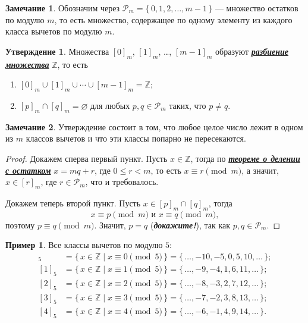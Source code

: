 \documentclass[14pt, a4paper]{extarticle}
\theoremstyle{definition}
\newtheorem*{remark}{Замечание}
\newtheorem{example}{Пример}
\newtheorem{statement}{Утверждение}
\begin{document}
	\begin{remark}
		Обозначим через $\mathcal{P}_m=\{\,0,1,2,\dots,m-1\,\}$ --- множество остатков по модулю $m$, то есть множество, содержащее по одному элементу из каждого класса вычетов по модулю $m$.
	\end{remark}
	
	\begin{statement}
		Множества $[0]_m$, $[1]_m$, \dots, $[m-1]_m$ образуют \href{https://ru.wikipedia.org/wiki/%D0%A0%D0%B0%D0%B7%D0%B1%D0%B8%D0%B5%D0%BD%D0%B8%D0%B5_%D0%BC%D0%BD%D0%BE%D0%B6%D0%B5%D1%81%D1%82%D0%B2%D0%B0}{\textbf{\textit{разбиение множества}}} $\mathbb{Z}$, то есть
		\begin{enumerate}[topsep=0pt,itemsep=-1ex,partopsep=1ex,parsep=1ex]
			\item $[0]_m\cup[1]_m\cup\cdots\cup[m-1]_m=\mathbb{Z}$;
			\item $[p]_m\cap[q]_m=\varnothing$ для любых $p,q\in\mathcal{P}_m$ таких, что $p\neq q$.
		\end{enumerate}
	\end{statement}
	\begin{remark}
		Утверждение состоит в том, что любое целое число лежит в одном из $m$ классов вычетов и что эти классы попарно не пересекаются.
	\end{remark}
	\begin{proof}
		Докажем сперва первый пункт. Пусть $x\in\mathbb{Z}$, тогда по \hyperref[ost]{\textbf{\textit{теореме о делении с остатком}}} $x=mq+r$, где $0\leqslant r<m$, то есть $x\equiv r\pmod{m}$, а значит, $x\in[r]_m$, где $r\in\mathcal{P}_m$, что и требовалось.
		
		Докажем теперь второй пункт. Пусть $x\in[p]_m\cap[q]_m$, тогда $$x\equiv p\pmod{m}\text{ и }x\equiv q\pmod{m},$$ поэтому $p\equiv q\pmod{m}$. Значит, $p=q$ (\textbf{\textit{докажите!}}), так как \mbox{$p,q\in\mathcal{P}_m$}.
	\end{proof}

	\begin{example}
		Все классы вычетов по модулю $5$:
		\begin{align*}
			[0]_5&=\{\,x\in\mathbb{Z}\mid x\equiv 0\pmod{5}\,\}=\{\,\dots,-10,-5,0,5,10,\dots\,\};\\
			[1]_5&=\{\,x\in\mathbb{Z}\mid x\equiv 1\pmod{5}\,\}=\{\,\dots,-9,-4,1,6,11,\dots\,\};\\
			[2]_5&=\{\,x\in\mathbb{Z}\mid x\equiv 2\pmod{5}\,\}=\{\,\dots,-8,-3,2,7,12,\dots\,\};\\
			[3]_5&=\{\,x\in\mathbb{Z}\mid x\equiv 3\pmod{5}\,\}=\{\,\dots,-7,-2,3,8,13,\dots\,\};\\
			[4]_5&=\{\,x\in\mathbb{Z}\mid x\equiv 4\pmod{5}\,\}=\{\,\dots,-6,-1,4,9,14,\dots\,\}.
		\end{align*}
	\end{example}
\end{document}
